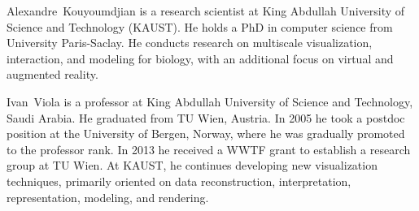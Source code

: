     \vskip -0.9996478cm 
\begin{IEEEbiography}{Alexandre~Kouyoumdjian}
is a research scientist at King Abdullah University of Science and Technology (KAUST). He holds a PhD in computer science from University Paris-Saclay. He conducts research on multiscale visualization, interaction, and modeling for biology, with an additional focus on virtual and augmented reality.
\end{IEEEbiography}
    \vskip -0.9996478cm 
\begin{IEEEbiography}{Ivan~Viola}
is a professor at King Abdullah University of Science and Technology, Saudi Arabia. He graduated from TU Wien, Austria. In 2005 he took a postdoc position at the University of Bergen, Norway, where he was gradually promoted to the professor rank. In 2013 he received a WWTF grant to establish a research group at TU Wien. At KAUST, he continues developing new visualization techniques, primarily oriented on data reconstruction, interpretation, representation, modeling, and rendering.
\end{IEEEbiography}
    \vskip -0.9996478cm 
